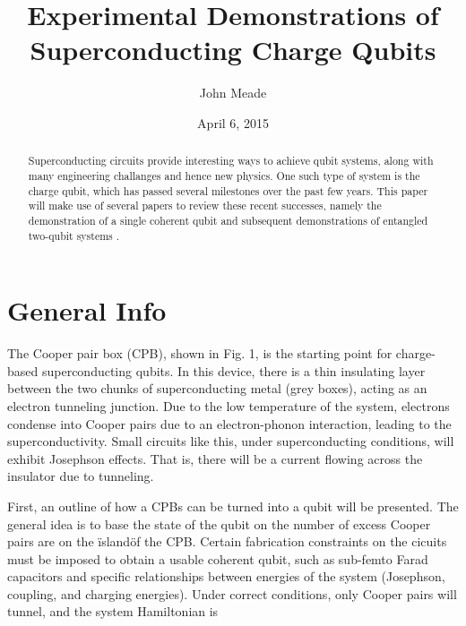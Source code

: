\documentclass[12pt,letterpaper,notitlepage]{report}
\begin{document}
\title{Experimental Demonstrations of Superconducting Charge Qubits}
\author{John Meade}
\date{April 6, 2015}

\maketitle

\begin{abstract}
\doublespacing
\noindent
Superconducting circuits provide interesting ways to achieve qubit systems, along with many engineering challanges and hence new physics. One such type of system is the charge qubit, which has passed several milestones over the past few years. This paper will make use of several papers to review these recent successes, namely the demonstration of a single coherent qubit \cite{singleCooperPair} and subsequent demonstrations of entangled two-qubit systems \cite{twoPulseGates}\cite{onePulseGateNature}\cite{onePulseGatePhysica}.
\end{abstract}

\pagebreak
\doublespacing

%
%

\section*{General Info}

The Cooper pair box (CPB), shown in Fig. 1, is the starting point for charge-based superconducting qubits. In this device, there is a thin insulating layer between the two chunks of superconducting metal (grey boxes), acting as an electron tunneling junction. Due to the low temperature of the system, electrons condense into Cooper pairs due to an electron-phonon interaction, leading to the superconductivity. Small circuits like this, under superconducting conditions, will exhibit Josephson effects. That is, there will be a current flowing across the insulator due to tunneling.

First, an outline of how a CPBs can be turned into a qubit will be presented. The general idea is to base the state of the qubit on the number of excess Cooper pairs are on the \"island\" of the CPB. Certain fabrication constraints on the cicuits must be imposed to obtain a usable coherent qubit, such as sub-femto Farad capacitors and specific relationships between energies of the system (Josephson, coupling, and charging energies). Under correct conditions, only Cooper pairs will tunnel, and the system Hamiltonian is
\end{document}
